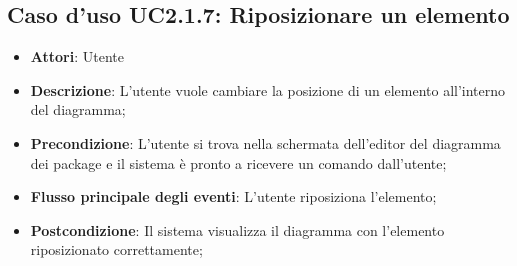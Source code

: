 \documentclass[../AnalisiDeiRequisiti.tex]{subfiles}
\begin{document}
	\subsection{Caso d'uso UC2.1.7: Riposizionare un elemento}
	\begin{itemize}
		\item \textbf{Attori}: Utente
		\item \textbf{Descrizione}: L'utente vuole cambiare la posizione di un elemento all'interno del diagramma;
		\item \textbf{Precondizione}: L'utente si trova nella schermata dell'editor del diagramma dei package e il sistema è pronto a ricevere un comando dall'utente;
		\item \textbf{Flusso principale degli eventi}: L'utente riposiziona l'elemento;
		\item \textbf{Postcondizione}: Il sistema visualizza il diagramma con l'elemento riposizionato correttamente;
	\end{itemize}
\end{document}
